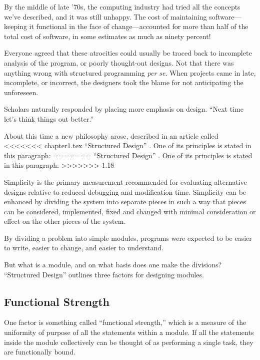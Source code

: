 By the middle of late '70s, the computing industry had tried all the
concepts we've described, and it was still unhappy. The cost of
maintaining software---keeping it functional in the face of
change---accounted for more than half of the total cost of software,
in some estimates as much as ninety percent!

Everyone agreed that these atrocities could usually be traced back to
incomplete analysis of the program, or poorly thought-out designs.
Not that there was anything wrong with structured programming
\emph{per se}. When projects came in late, incomplete, or incorrect,
the designers took the blame for not anticipating the unforeseen. 

Scholars naturally responded by placing more emphasis on design.
``Next time let's think things out better.''

About this time a new philosophy arose, described in an article called
<<<<<<< chapter1.tex
``Structured Design'' \cite{stevens74}. One of its principles is
stated in this paragraph: 
=======
``Structured Design'' \cite{stevens74-1}. One of its principles is stated in
this paragraph: 
>>>>>>> 1.18

\begin{tfquot}
Simplicity is the primary measurement recommended for evaluating
alternative designs relative to reduced debugging and modification
time. Simplicity can be enhanced by dividing the system into separate
pieces in such a way that pieces can be considered, implemented, fixed
and changed with minimal consideration or effect on the other pieces
of the system.
\end{tfquot}
By dividing a problem into simple modules, programs were expected to
be easier to write, easier to change, and easier to understand.

But what is a module, and on what basis does one make the divisions?
``Structured Design'' outlines three factors for designing modules.


\subsection{Functional Strength}
One factor is something called ``functional strength,'' which is a
measure of the uniformity of purpose of all the statements within a
module. If all the statements inside the module collectively can be
thought of as performing a single task, they are functionally bound.

